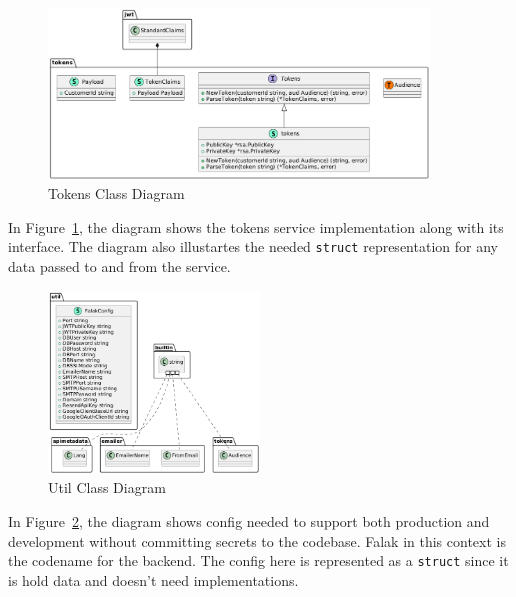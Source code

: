 \begin{figure}[!h]
    \centering
    \includegraphics[width=0.9\textwidth]{images/docs/diagrams/class/class-diagram/tokens.png}
    \caption{Tokens Class Diagram}
    \label{fig:tokens-class-diagram}
\end{figure}

In Figure~\ref{fig:tokens-class-diagram}, the diagram shows the tokens service implementation along with its interface. The diagram also illustartes the needed \texttt{struct} representation for any data passed to and from the service.



\begin{figure}[!h]
    \centering
    \includegraphics[width=0.5\textwidth]{images/docs/diagrams/class/class-diagram/util.png}
    \caption{Util Class Diagram}
    \label{fig:util-class-diagram}
\end{figure}

In Figure~\ref{fig:util-class-diagram}, the diagram shows config needed to support both production and development without committing secrets to the codebase. Falak in this context is the codename for the backend. The config here is represented as a \texttt{struct} since it is hold data and doesn't need implementations.